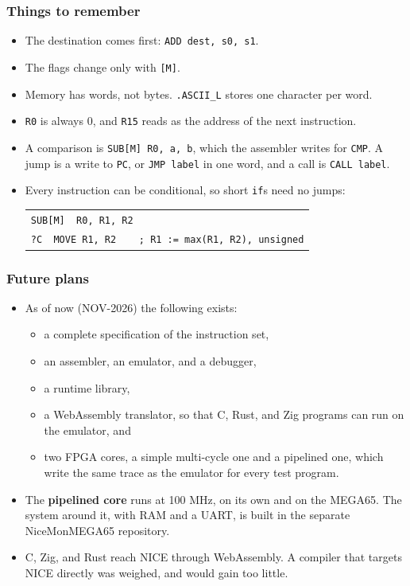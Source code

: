 \documentclass{beamer}
\newcommand{\code}[1]{\texttt{#1}}
\begin{document}
%
  \begin{frame}
   \frametitle{Things to remember}
   \begin{itemize}
    \item The destination comes first: \code{ADD dest, s0, s1}.
    \item The flags change only with \code{[M]}.
    \item Memory has words, not bytes. \code{.ASCII\_L} stores one
     character per word.
    \item \code{R0} is always 0, and \code{R15} reads as the address of the
     next instruction.
    \item A comparison is \code{SUB[M] R0, a, b}, which the assembler
     writes for \code{CMP}. A jump is a write to \code{PC}, or
     \code{JMP label} in one word, and a call is \code{CALL label}.
    \item Every instruction can be conditional, so short \code{if}s need
     no jumps:
     \begin{center}
      \begin{tabular}{l}
       \code{SUB[M] ~R0, R1, R2}\\
       \code{?C~~MOVE R1, R2~~~~; R1 := max(R1, R2), unsigned}\\
      \end{tabular}
     \end{center}
   \end{itemize}
  \end{frame}
%
  \begin{frame}
   \frametitle{Future plans}
   \begin{itemize}
    \item As of now (NOV-2026) the following exists:
     \begin{itemize}
      \item a complete specification of the instruction set,
      \item an assembler, an emulator, and a debugger,
      \item a runtime library,
      \item a WebAssembly translator, so that C, Rust, and Zig programs
       can run on the emulator, and
      \item two FPGA cores, a simple multi-cycle one and a pipelined
       one, which write the same trace as the emulator for every test
       program.
     \end{itemize}
    \item The \textbf{pipelined core} runs at 100 MHz, on its own and on
     the MEGA65. The system around it, with RAM and a UART, is built in
     the separate NiceMonMEGA65 repository.
    \item C, Zig, and Rust reach NICE through WebAssembly. A compiler
     that targets NICE directly was weighed, and would gain too little.
   \end{itemize}
  \end{frame}
\end{document}
